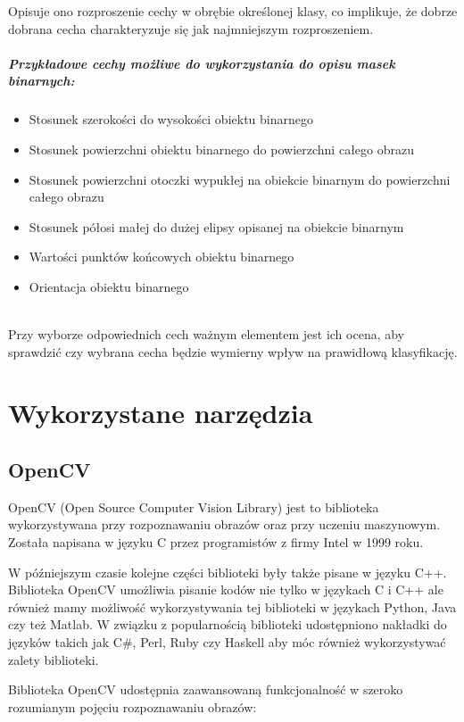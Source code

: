 \documentclass[a4paper,12pt,twoside,openany]{report}
\begin{document}
	
	Opisuje ono rozproszenie cechy w obrębie określonej klasy, co implikuje, że dobrze dobrana cecha charakteryzuje się jak najmniejszym rozproszeniem.

\paragraph{Przykładowe cechy możliwe do wykorzystania do opisu masek binarnych: }
\begin{itemize}
	\item Stosunek szerokości do wysokości obiektu binarnego
	\item Stosunek powierzchni obiektu binarnego do powierzchni całego obrazu
	\item Stosunek powierzchni otoczki wypukłej na obiekcie binarnym do powierzchni całego obrazu
	\item Stosunek półosi małej do dużej elipsy opisanej na obiekcie binarnym 
	\item Wartości punktów końcowych obiektu binarnego
	\item Orientacja obiektu binarnego
\end{itemize}
\mbox{} \\
Przy wyborze odpowiednich cech ważnym elementem jest ich ocena, aby sprawdzić czy wybrana cecha będzie wymierny wpływ na prawidłową klasyfikację.

\chapter{Wykorzystane narzędzia}

\section{OpenCV}
OpenCV (Open Source Computer Vision Library) jest to biblioteka wykorzystywana przy rozpoznawaniu obrazów oraz przy uczeniu maszynowym. Została napisana w języku C przez programistów z firmy Intel w 1999 roku.

W późniejszym czasie kolejne części biblioteki były także pisane w języku C++. Biblioteka OpenCV umożliwia pisanie kodów nie tylko w językach C i C++ ale również mamy możliwość wykorzystywania tej biblioteki w językach Python, Java czy też Matlab. W związku z popularnością biblioteki udostępniono nakładki do języków takich jak C\#, Perl, Ruby czy Haskell aby móc również wykorzystywać zalety  biblioteki. 

Biblioteka OpenCV udostępnia zaawansowaną funkcjonalność  w szeroko rozumianym pojęciu rozpoznawaniu obrazów:
\end{document}
